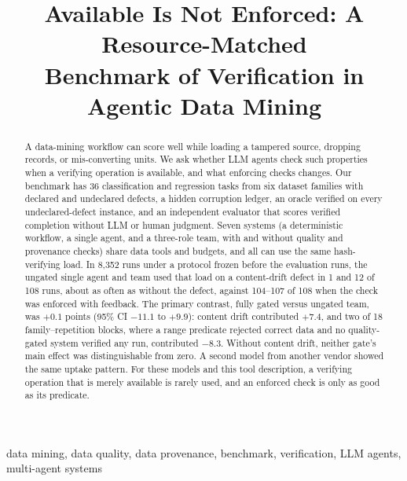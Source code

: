 \documentclass[conference]{IEEEtran}
\begin{document}
\title{Available Is Not Enforced: A Resource-Matched\\ Benchmark of Verification in Agentic Data Mining}

\author{
}

\maketitle

\begin{abstract}
A data-mining workflow can score well while loading a tampered source, dropping records, or mis-converting units.
We ask whether LLM agents check such properties when a verifying operation is available, and what enforcing checks
changes. Our benchmark has 36 classification and regression tasks from six dataset families with declared and
undeclared defects, a hidden corruption ledger, an oracle verified on every undeclared-defect instance, and an
independent evaluator that scores verified completion without LLM or human judgment. Seven systems (a deterministic
workflow, a single agent, and a three-role team, with and without quality and provenance checks) share data tools
and budgets, and all can use the same hash-verifying load. In 8,352 runs under a protocol frozen before the
evaluation runs, the ungated single agent and team used that load on a content-drift defect in 1 and 12 of 108 runs,
about as often as without the defect, against 104--107 of 108 when the check was enforced with feedback. The primary
contrast, fully gated versus ungated team, was $+0.1$ points (95\% CI $-11.1$ to $+9.9$): content drift contributed
$+7.4$, and two of 18 family--repetition blocks, where a range predicate rejected correct data and no quality-gated
system verified any run, contributed $-8.3$. Without content drift, neither gate's main effect was distinguishable
from zero. A second model from another vendor showed the same uptake pattern. For these models and this tool
description, a verifying operation that is merely available is rarely used, and an enforced check is only as good
as its predicate.
\end{abstract}

\begin{IEEEkeywords}
data mining, data quality, data provenance, benchmark, verification, LLM agents, multi-agent systems
\end{IEEEkeywords}
\end{document}
